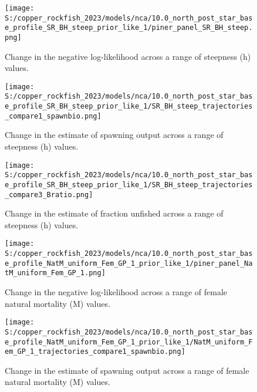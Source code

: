 \documentclass[11pt,
  letterpaper,
]{article}
\begin{document}
\pagebreak

\begin{figure}
{\centering
\texttt{[image: S:/copper\_rockfish\_2023/models/nca/10.0\_north\_post\_star\_base\_profile\_SR\_BH\_steep\_prior\_like\_1/piner\_panel\_SR\_BH\_steep.png]}
}
\caption{Change in the negative log-likelihood across a range of steepness (h) values.\label{fig:h-profile}}
\end{figure}

\pagebreak

\begin{figure}
{\centering
\texttt{[image: S:/copper\_rockfish\_2023/models/nca/10.0\_north\_post\_star\_base\_profile\_SR\_BH\_steep\_prior\_like\_1/SR\_BH\_steep\_trajectories\_compare1\_spawnbio.png]}
}
\caption{Change in the estimate of spawning output across a range of steepness (h) values.\label{fig:h-ssb}}
\end{figure}

\pagebreak

\begin{figure}
{\centering
\texttt{[image: S:/copper\_rockfish\_2023/models/nca/10.0\_north\_post\_star\_base\_profile\_SR\_BH\_steep\_prior\_like\_1/SR\_BH\_steep\_trajectories\_compare3\_Bratio.png]}
}
\caption{Change in the estimate of fraction unfished across a range of steepness (h) values.\label{fig:h-depl}}
\end{figure}

\pagebreak

\begin{figure}
{\centering
\texttt{[image: S:/copper\_rockfish\_2023/models/nca/10.0\_north\_post\_star\_base\_profile\_NatM\_uniform\_Fem\_GP\_1\_prior\_like\_1/piner\_panel\_NatM\_uniform\_Fem\_GP\_1.png]}
}
\caption{Change in the negative log-likelihood across a range of female natural mortality (M) values.\label{fig:m-profile}}
\end{figure}

\pagebreak

\begin{figure}
{\centering
\texttt{[image: S:/copper\_rockfish\_2023/models/nca/10.0\_north\_post\_star\_base\_profile\_NatM\_uniform\_Fem\_GP\_1\_prior\_like\_1/NatM\_uniform\_Fem\_GP\_1\_trajectories\_compare1\_spawnbio.png]}
}
\caption{Change in the estimate of spawning output across a range of female natural mortality (M) values.\label{fig:m-ssb}}
\end{figure}
\end{document}
